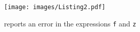 

\begin{figure}
    \centering
    \texttt{[image: images/Listing2.pdf]}
    \caption{\chameleon{} reports an error in the expressions \texttt{f} and \texttt{z}}
    \label{fig:listing2}
\end{figure}




